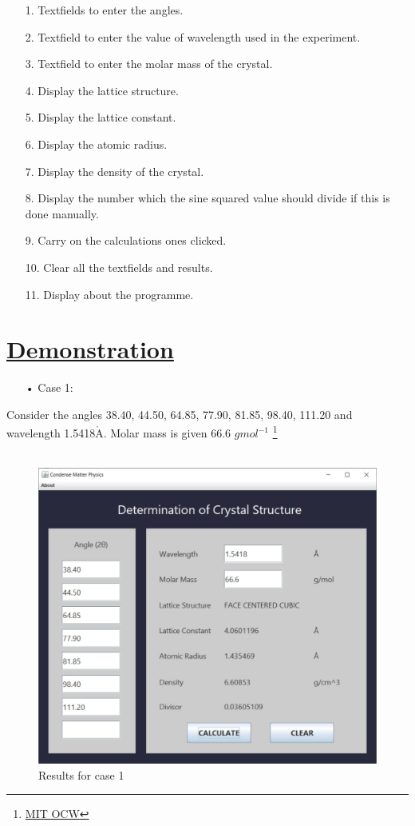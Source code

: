 \documentclass[a4paper]{article}
\begin{document}
\begin{enumerate}
\item[1.] Textfields to enter the angles.
\item[2.] Textfield to enter the value of wavelength used in the experiment.
\item[3.] Textfield to enter the molar mass of the crystal.
\item[4.] Display the lattice structure.
\item[5.] Display the lattice constant.
\item[6.] Display the atomic radius.
\item[7.] Display the density of the crystal.
\item[8.] Display the number which the sine squared value should divide if this is done manually.
\item[9.] Carry on the calculations ones clicked.
\item[10.] Clear all the textfields and results.
\item[11.] Display about the programme.
\end{enumerate}





\newpage
\section{\underline{Demonstration}}
\vspace{1em}
\begin{enumerate}
	\item[•] Case 1:
\end{enumerate}

Consider the angles 38.40, 44.50, 64.85, 77.90, 81.85, 98.40, 111.20 and wavelength 1.5418$\mathring{\mathrm{A}}$. Molar mass is given 66.6 $g mol^{-1}$ \footnote{\href{https://ocw.mit.edu/courses/3-091sc-introduction-to-solid-state-chemistry-fall-2010/ec60f89132400083b748c3dcde9e6e67_MIT3_091SCF09_hw18_sol.pdf}{MIT OCW}}
\\\\
\begin{figure}[h!]
\centering
\includegraphics[width=402 px,height=307.625 px]{3.1}
\caption{Results for case 1}
\end{figure}
\end{document}
